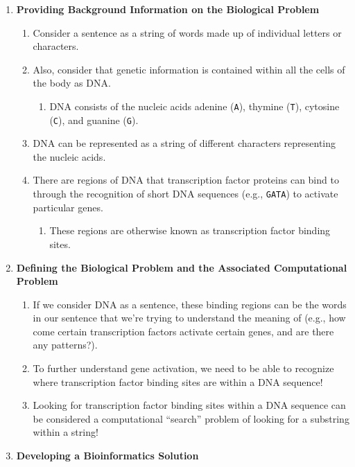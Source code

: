 \begin{enumerate}
    \item \textbf{Providing Background Information on the Biological Problem}
    \begin{enumerate}
        \item Consider a sentence as a string of words made up of individual letters or characters. 
        \item Also, consider that genetic information is contained within all the cells of the body as DNA.
        \begin{enumerate}
            \item DNA consists of the nucleic acids adenine (\verb|A|), thymine (\verb|T|), cytosine (\verb|C|), and guanine (\verb|G|).
        \end{enumerate}
        \item DNA can be represented as a string of different characters representing the nucleic acids.  
        \item There are regions of DNA that transcription factor proteins can bind to through the recognition of short DNA sequences (e.g., \verb|GATA|) to activate particular genes.
        \begin{enumerate}
            \item These regions are otherwise known as transcription factor binding sites.
        \end{enumerate}
    \end{enumerate}
    \item \textbf{Defining the Biological Problem and the Associated Computational Problem}
    \begin{enumerate}
        \item If we consider DNA as a sentence, these binding regions can be the words in our sentence that we’re trying to understand the meaning of (e.g., how come certain transcription factors activate certain genes, and are there any patterns?). 
        \item To further understand gene activation, we need to be able to recognize where transcription factor binding sites are within a DNA sequence!
        \item Looking for transcription factor binding sites within a DNA sequence can be considered a computational “search” problem of looking for a substring within a string! 
    \end{enumerate}
    \item \textbf{Developing a Bioinformatics Solution}
    \begin{enumerate}

\end{enumerate}
\end{enumerate}
